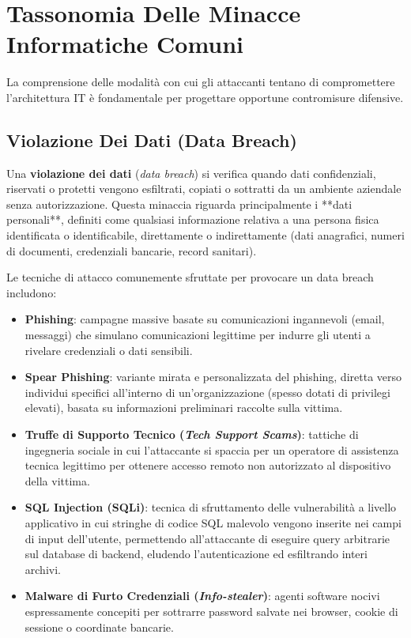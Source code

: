 \documentclass[11pt, a4paper]{article}
\begin{document}
\newpage

\section{Tassonomia Delle Minacce Informatiche Comuni}

La comprensione delle modalità con cui gli attaccanti tentano di compromettere l'architettura IT è fondamentale per progettare opportune contromisure difensive.

\subsection{Violazione Dei Dati (Data Breach)}

Una \textbf{violazione dei dati} (\emph{data breach}) si verifica quando dati confidenziali, riservati o protetti vengono esfiltrati, copiati o sottratti da un ambiente aziendale senza autorizzazione. Questa minaccia riguarda principalmente i **dati personali**, definiti come qualsiasi informazione relativa a una persona fisica identificata o identificabile, direttamente o indirettamente (dati anagrafici, numeri di documenti, credenziali bancarie, record sanitari).

Le tecniche di attacco comunemente sfruttate per provocare un data breach includono:
\begin{itemize}[leftmargin=*]
    \item \textbf{Phishing}: campagne massive basate su comunicazioni ingannevoli (email, messaggi) che simulano comunicazioni legittime per indurre gli utenti a rivelare credenziali o dati sensibili.
    \item \textbf{Spear Phishing}: variante mirata e personalizzata del phishing, diretta verso individui specifici all'interno di un'organizzazione (spesso dotati di privilegi elevati), basata su informazioni preliminari raccolte sulla vittima.
    \item \textbf{Truffe di Supporto Tecnico (\emph{Tech Support Scams})}: tattiche di ingegneria sociale in cui l'attaccante si spaccia per un operatore di assistenza tecnica legittimo per ottenere accesso remoto non autorizzato al dispositivo della vittima.
    \item \textbf{SQL Injection (SQLi)}: tecnica di sfruttamento delle vulnerabilità a livello applicativo in cui stringhe di codice SQL malevolo vengono inserite nei campi di input dell'utente, permettendo all'attaccante di eseguire query arbitrarie sul database di backend, eludendo l'autenticazione ed esfiltrando interi archivi.
    \item \textbf{Malware di Furto Credenziali (\emph{Info-stealer})}: agenti software nocivi espressamente concepiti per sottrarre password salvate nei browser, cookie di sessione o coordinate bancarie.
\end{itemize}
\end{document}
